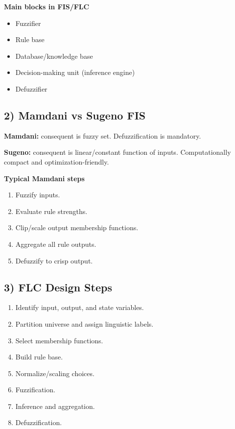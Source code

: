 \documentclass[11pt,a4paper]{article}
\begin{document}
\textbf{Main blocks in FIS/FLC}
\begin{itemize}
\item Fuzzifier
\item Rule base
\item Database/knowledge base
\item Decision-making unit (inference engine)
\item Defuzzifier
\end{itemize}

\begin{center}
\end{center}

\subsection*{2) Mamdani vs Sugeno FIS}
\textbf{Mamdani:} consequent is fuzzy set. Defuzzification is mandatory.

\textbf{Sugeno:} consequent is linear/constant function of inputs. Computationally compact and optimization-friendly.

\textbf{Typical Mamdani steps}
\begin{enumerate}
\item Fuzzify inputs.
\item Evaluate rule strengths.
\item Clip/scale output membership functions.
\item Aggregate all rule outputs.
\item Defuzzify to crisp output.
\end{enumerate}

\subsection*{3) FLC Design Steps}
\begin{enumerate}
\item Identify input, output, and state variables.
\item Partition universe and assign linguistic labels.
\item Select membership functions.
\item Build rule base.
\item Normalize/scaling choices.
\item Fuzzification.
\item Inference and aggregation.
\item Defuzzification.
\end{enumerate}
\end{document}
